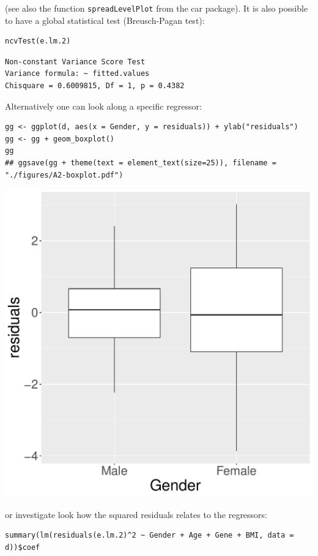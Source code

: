 \documentclass[12pt]{article}
\begin{document}
(see also the function \texttt{spreadLevelPlot} from the car package). It is
also possible to have a global statistical test (Breusch-Pagan test):
\lstset{language=r,label= ,caption= ,captionpos=b,numbers=none}
\begin{lstlisting}
ncvTest(e.lm.2)
\end{lstlisting}

\begin{verbatim}
Non-constant Variance Score Test 
Variance formula: ~ fitted.values 
Chisquare = 0.6009815, Df = 1, p = 0.4382
\end{verbatim}

Alternatively one can look along a specific regressor:
\lstset{language=r,label= ,caption= ,captionpos=b,numbers=none}
\begin{lstlisting}
gg <- ggplot(d, aes(x = Gender, y = residuals)) + ylab("residuals")
gg <- gg + geom_boxplot()
gg
## ggsave(gg + theme(text = element_text(size=25)), filename = "./figures/A2-boxplot.pdf")
\end{lstlisting}

\begin{center}
\includegraphics[width=.9\linewidth]{./figures/A2-boxplot.pdf}
\end{center}

or investigate look how the squared residuals relates to the
regressors:
\lstset{language=r,label= ,caption= ,captionpos=b,numbers=none}
\begin{lstlisting}
summary(lm(residuals(e.lm.2)^2 ~ Gender + Age + Gene + BMI, data = d))$coef
\end{lstlisting}
\end{document}
